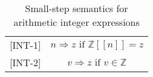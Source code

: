 \begin{table}[H]
    \centering
    \begin{longtable}[c] { r c }
        
        [INT-1] & \( n \Rightarrow z \text{ if } \mathbb{Z}[[n]] = z \) \\
        
        [INT-2] & \( v \Rightarrow z \text{ if } v \in \mathbb{Z} \)\\
        
    \end{longtable}
    \caption{Small-step semantics for arithmetic integer expressions}\label{tab:sss_aud}
\end{table}